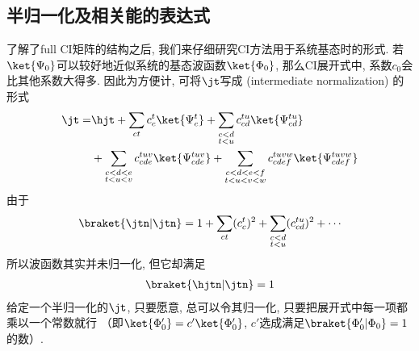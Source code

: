\subsection{半归一化及相关能的表达式}
了解了full CI矩阵的结构之后, 
我们来仔细研究CI方法用于系统基态时的形式. 
若$\ket{\Psi_0}$可以较好地近似系统的基态波函数$\ket{\Phi_0}$, 
那么CI展开式中, 
系数$c_0$会比其他系数大得多. 
因此为方便计, 
可将$\jt$写成\emph{} (intermediate normalization) 的形式
\begin{align}
\label{4.4}
\jt =& \hjt + \sum_{ct}c_c^t\ket{\Psi_c^t} + \sum_{\substack{c<d\\t<u}} c_{cd}^{tu}\ket{\Psi_{cd}^{tu}}\notag\\
&+\sum_{\substack{c<d<e\\t<u<v}} c_{cde}^{tuv}\ket{\Psi_{cde}^{tuv}} +\sum_{\substack{c<d<e<f\\t<u<v<w}} c_{cdef}^{tuvw}\ket{\Psi_{cdef}^{tuvw}}
\end{align}
由于
\begin{align}
\braket{\jtn|\jtn} = 1 + \sum_{ct}(c_c^t)^2 + \sum_{\substack{c<d\\t<u}} (c_{cd}^{tu})^2 + \cdots \notag
\end{align}
所以波函数其实并未归一化, 
但它却满足
\begin{align}
\braket{\hjtn|\jtn} = 1
\end{align}
给定一个半归一化的$\jt$, 
只要愿意, 
总可以令其归一化, 
只要把展开式中每一项都乘以一个常数就行 （即$\ket{\Phi_0'}=c'\ket{\Phi_0'}$, 
$c'$选成满足$\braket{\Phi_0'|\Phi_0}=1$的数）.


